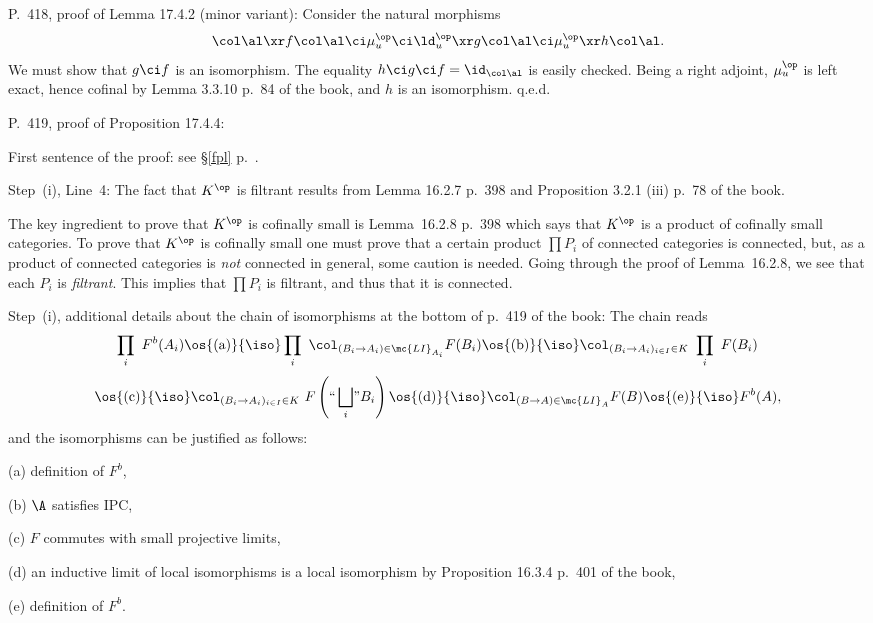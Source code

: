 \documentclass[12pt]{article}
\theoremstyle{remark}
\theoremstyle{definition}
\begin{document}
%

\begin{s} 
P.~418, proof of Lemma 17.4.2 (minor variant): Consider the natural morphisms 
$$
\col\al\xr f\col\al\ci\mu_u^{\op}\ci\ld_u^{\op}\xr g\col\al\ci\mu_u^{\op}\xr h\col\al.
$$
We must show that $g\ci f$ is an isomorphism. The equality $h\ci g\ci f=\id_{\col\al}$ is easily checked. Being a right adjoint, $\mu_u^{\op}$ is left exact, hence cofinal by Lemma 3.3.10 p.~84 of the book, and $h$ is an isomorphism. q.e.d.
\end{s}  

%

\begin{s}
P.~419, proof of Proposition 17.4.4: 

\nn First sentence of the proof: see \S\ref{fpl} p.~. 


\nn Step~(i), Line~4: The fact that $K^{\op}$ is filtrant results from Lemma 16.2.7 p.~398 and Proposition 3.2.1 (iii) p.~78 of the book. 

The key ingredient to prove that $K^{\op}$ is cofinally small is Lemma~16.2.8 p.~398 which says that $K^{\op}$ is a product of cofinally small categories. To prove that $K^{\op}$ is cofinally small one must prove that a certain product $\prod P_i$ of connected categories is connected, but, as a product of connected categories is \emph{not} connected in general, some caution is needed. Going through the proof of Lemma~16.2.8, we see that each $P_i$ is \emph{filtrant}. This implies that $\prod P_i$ is filtrant, and thus that it is connected.

\nn Step~(i), additional details about the chain of isomorphisms at the bottom of p.~419 of the book: The chain reads 
$$
\prod_i\ F^b(A_i)
\os{(\text a)}{\iso}\prod_i\ \col_{(B_i\to A_i)\in\mc{LI}_{A_i}}F(B_i)
\os{(\text b)}{\iso}\col_{(B_i\to A_i)_{i\in I}\in K}\ \prod_i\ F(B_i)
$$
$$
\os{(\text c)}{\iso}\col_{(B_i\to A_i)_{i\in I}\in K}\ F\left(``\bigsqcup_i\!"B_i\right)
\os{(\text d)}{\iso}\col_{(B\to A)\in\mc{LI}_A}F(B)
\os{(\text e)}{\iso}F^b(A), 
$$ 
and the isomorphisms can be justified as follows: 

\nn(a) definition of $F^b$, 

\nn(b) $\A$ satisfies IPC,

\nn(c) $F$ commutes with small projective limits, 

\nn(d) an inductive limit of local isomorphisms is a local isomorphism by Proposition 16.3.4 p.~401 of the book, 

\nn(e) definition of $F^b$. 
\end{s} 
\end{document}
